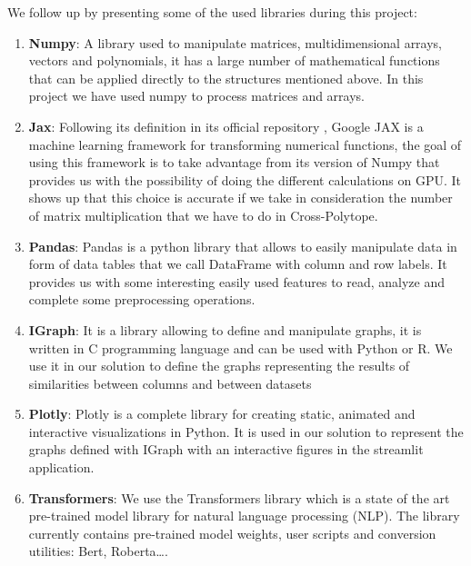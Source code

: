 We follow up by presenting some of the used libraries during this project:

\begin{enumerate}
    \item \textbf{Numpy}:
A library used to manipulate matrices, multidimensional arrays, vectors and
polynomials, it has a large number of mathematical functions that can be applied
directly to the structures mentioned above. In this project we have used numpy
to process matrices and arrays.
    
    \item \textbf{Jax}:
Following its definition in its official repository \citep{jax_2022}, Google JAX
is a machine learning framework for transforming numerical functions, the goal
of using this framework is to take advantage from its version of Numpy that
provides us with the possibility of doing the different calculations on GPU. It
shows up that this choice is accurate if we take in consideration the number of
matrix multiplication that we have to do in Cross-Polytope.

    \item \textbf{Pandas}:
Pandas is a python library that allows to easily manipulate data in form of data
tables that we call DataFrame with column and row labels. It provides us with
some interesting easily used features to read, analyze and complete some
preprocessing operations.

    \item \textbf{IGraph}:
It is a library allowing to define and manipulate graphs, it is written in C
programming language and can be used with Python or R. We use it in our solution
to define the graphs representing the results of similarities between columns
and between datasets

    \item \textbf{Plotly}:
Plotly is a complete library for creating static, animated and interactive
visualizations in Python. It is used in our solution to represent the graphs
defined with IGraph with an interactive figures in the streamlit application.

    \item \textbf{Transformers}:
We use the Transformers library which is a state of the art pre-trained model
library for natural language processing (NLP). The library currently contains
pre-trained model weights, user scripts and conversion utilities: Bert,
Roberta\ldots.

\end{enumerate}


